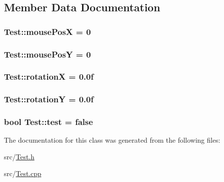\subsection{Member Data Documentation}
\hypertarget{classTest_a480574c4cb8a857e5e9abc688b268d57}{
\subsubsection[{mousePosX}]{ {\bf Test::mousePosX} = 0}}
\label{classTest_a480574c4cb8a857e5e9abc688b268d57}
\hypertarget{classTest_a69548f4b03e9b8193e5f460dd339a71e}{
\subsubsection[{mousePosY}]{ {\bf Test::mousePosY} = 0}}
\label{classTest_a69548f4b03e9b8193e5f460dd339a71e}
\hypertarget{classTest_ab43ab44c8f4ce5505edefd22fa88dbfb}{
\subsubsection[{rotationX}]{ {\bf Test::rotationX} = 0.0f}}
\label{classTest_ab43ab44c8f4ce5505edefd22fa88dbfb}
\hypertarget{classTest_a718270463659bee4d58f84cd85afa1d8}{
\subsubsection[{rotationY}]{ {\bf Test::rotationY} = 0.0f}}
\label{classTest_a718270463659bee4d58f84cd85afa1d8}
\hypertarget{classTest_ab9b7c96eff4aa942c802e282201d2bef}{
\subsubsection[{test}]{\setlength{\rightskip}{0pt plus 5cm}bool {\bf Test::test} = false}}
\label{classTest_ab9b7c96eff4aa942c802e282201d2bef}


The documentation for this class was generated from the following files:\begin{DoxyCompactItemize}
\item 
src/\hyperlink{Test_8h}{Test.h}\item 
src/\hyperlink{Test_8cpp}{Test.cpp}\end{DoxyCompactItemize}
